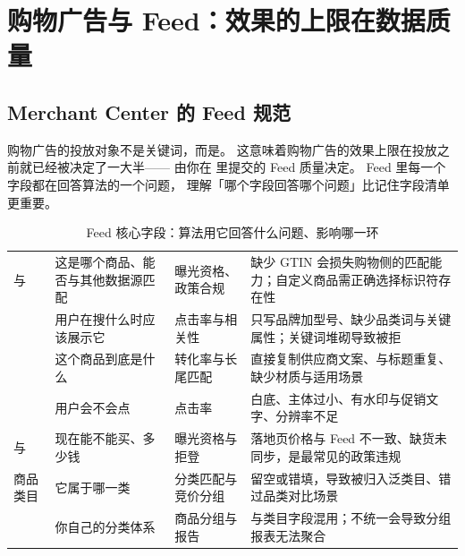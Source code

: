 \section{购物广告与 Feed：效果的上限在数据质量}
\label{sec:g-feed}

\subsection{Merchant Center 的 Feed 规范}

购物广告的投放对象不是关键词，而是。
这意味着购物广告的效果上限在投放之前就已经被决定了一大半——
由你在 里提交的 Feed 质量决定。
Feed 里每一个字段都在回答算法的一个问题，
理解「哪个字段回答哪个问题」比记住字段清单更重要。

\begin{table}[htbp]
\centering
\caption{Feed 核心字段：算法用它回答什么问题、影响哪一环}
\label{tab:g-feed}
\small
\begin{tabularx}{\textwidth}{L{2.4cm} L{3.3cm} L{2.3cm} Y}
\toprule
{} &  &  &  \\
\midrule
{} 与  & 这是哪个商品、能否与其他数据源匹配 & 曝光资格、政策合规 & 缺少 GTIN 会损失购物侧的匹配能力；自定义商品需正确选择标识符存在性 \\
\addlinespace
{} & 用户在搜什么时应该展示它 & 点击率与相关性 & 只写品牌加型号、缺少品类词与关键属性；关键词堆砌导致被拒 \\
\addlinespace
{} & 这个商品到底是什么 & 转化率与长尾匹配 & 直接复制供应商文案、与标题重复、缺少材质与适用场景 \\
\addlinespace
{} & 用户会不会点 & 点击率 & 白底、主体过小、有水印与促销文字、分辨率不足 \\
\addlinespace
{} 与  & 现在能不能买、多少钱 & 曝光资格与拒登 & 落地页价格与 Feed 不一致、缺货未同步，是最常见的政策违规 \\
\addlinespace
商品类目\newline{} & 它属于哪一类 & 分类匹配与竞价分组 & 留空或错填，导致被归入泛类目、错过品类对比场景 \\
\addlinespace
{} & 你自己的分类体系 & 商品分组与报告 & 与类目字段混用；不统一会导致分组报表无法聚合 \\
\bottomrule
\end{tabularx}
\end{table}

